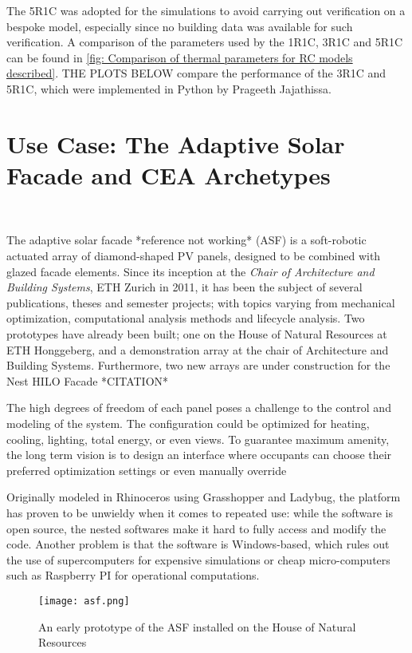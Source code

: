 The 5R1C was adopted for the simulations to avoid carrying out verification on a bespoke model, especially since no building data was available for such verification. A comparison of the parameters used by the 1R1C, 3R1C and 5R1C can be found in \ref{fig: Comparison of thermal parameters for RC models described}. THE PLOTS BELOW compare the performance of the 3R1C and 5R1C, which were implemented in Python by Prageeth Jajathissa.


\newpage
\section{Use Case: The Adaptive Solar Facade and CEA Archetypes}\

The adaptive solar facade *reference not working* (ASF) is a soft-robotic actuated array of diamond-shaped PV panels, designed to be combined with glazed facade elements. Since its inception at the \textit{Chair of Architecture and Building Systems}, ETH Zurich in 2011, it has been the subject of several publications, theses and semester projects; with topics varying from mechanical optimization, computational analysis methods and lifecycle analysis. Two prototypes have already been built; one on the House of Natural Resources at ETH Honggeberg, and a demonstration array at the chair of Architecture and Building Systems. Furthermore, two new arrays are under construction for the Nest HILO Facade *CITATION* \par

The high degrees of freedom of each panel poses a challenge to the control and modeling of the system. The configuration could be optimized for heating, cooling, lighting, total energy, or even views. To guarantee maximum amenity, the long term vision is to design an interface where occupants can choose their preferred optimization settings or even manually override 

Originally modeled in Rhinoceros using Grasshopper and Ladybug, the platform has proven to be unwieldy when it comes to repeated use: while the software is open source, the nested softwares make it hard to fully access and modify the code. Another problem is that the software is Windows-based, which rules out the use of supercomputers for expensive simulations or cheap micro-computers such as Raspberry PI for operational computations.\par

\begin{figure}[h] %
  \begin{center}
    \texttt{[image: asf.png]}
    \caption{An early prototype of the ASF installed on the House of Natural Resources}
    \label{fig: ASF}
  \end{center} 
\end{figure}

